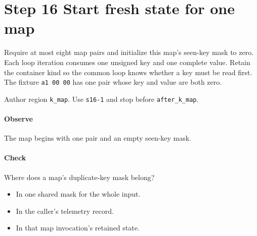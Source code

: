 \section{Step 16 Start fresh state for one map}\label{cbor-s16}
Require at most eight map pairs and initialize this map's seen-key mask to zero. Each loop iteration consumes one unsigned key and one complete value. Retain the container kind so the common loop knows whether a key must be read first. The fixture \texttt{a1 00 00} has one pair whose key and value are both zero.

Author region \texttt{k\_map}. Use \texttt{s16-1} and stop before \texttt{after\_k\_map}.

\paragraph{Observe} The map begins with one pair and an empty seen-key mask.

\paragraph{Check} Where does a map's duplicate-key mask belong?
\begin{itemize}
\item[A.] In one shared mask for the whole input.
\item[B.] In the caller's telemetry record.
\item[C.] In that map invocation's retained state.
\end{itemize}
